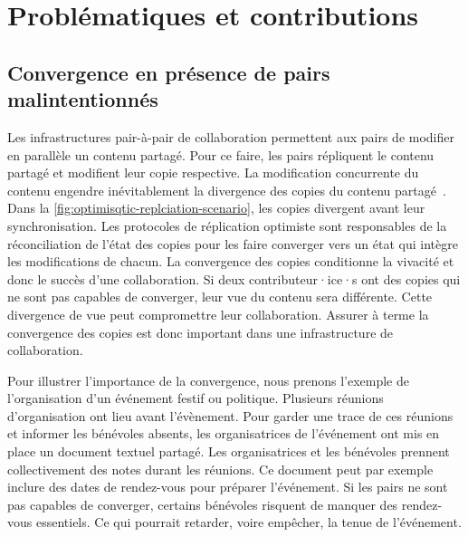\section{Problématiques et contributions}\label{sec:problematic}


\subsection{Convergence en présence de pairs malintentionnés}

Les infrastructures pair-à-pair de collaboration permettent aux pairs de modifier en parallèle un contenu partagé.
Pour ce faire, les pairs répliquent le contenu partagé et modifient leur copie respective.
La modification concurrente du contenu engendre inévitablement la divergence des copies du contenu partagé~\autocite{dourish_1995_divergence}.
Dans la \autoref{fig:optimisqtic-replciation-scenario}, les copies divergent avant leur synchronisation.
Les protocoles de réplication optimiste sont responsables de la réconciliation de l'état des copies pour les faire converger vers un état qui intègre les modifications de chacun.
La convergence des copies conditionne la vivacité et donc le succès d'une collaboration.
Si deux contributeur·ice·s ont des copies qui ne sont pas capables de converger, leur vue du contenu sera différente.
Cette divergence de vue peut compromettre leur collaboration.
Assurer à terme la convergence des copies est donc important dans une infrastructure de collaboration.

Pour illustrer l'importance de la convergence, nous prenons l'exemple de l'organisation d'un événement festif ou politique.
Plusieurs réunions d'organisation ont lieu avant l'évènement.
Pour garder une trace de ces réunions et informer les bénévoles absents, les organisatrices de l'événement ont mis en place un document textuel partagé.
Les organisatrices et les bénévoles prennent collectivement des notes durant les réunions.
Ce document peut par exemple inclure des dates de rendez-vous pour préparer l'événement.
Si les pairs ne sont pas capables de converger, certains bénévoles risquent de manquer des rendez-vous essentiels.
Ce qui pourrait retarder, voire empêcher, la tenue de l'événement.

